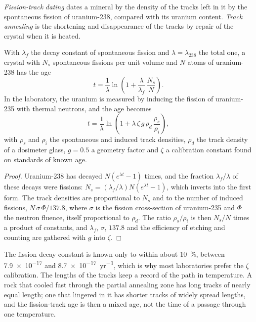\begin{definition}\label{def:b3:advanced-geochronology:fission-track}
\emph{Fission-track dating} dates a mineral by
the density of the tracks left in it by the spontaneous fission of
uranium-238, compared with its uranium content. \emph{Track
annealing} is the shortening and disappearance of the
tracks by repair of the crystal when it is heated.
\end{definition}

\begin{theorem}\label{thm:b3:advanced-geochronology:fission-track}
With $\lambda_f$ the decay constant of spontaneous fission and $\lambda =
\lambda_{238}$ the total one, a crystal with $N_s$ spontaneous fissions per unit
volume and $N$ atoms of uranium-238 has the age
\[
t = \frac1\lambda\ln\left(1 + \frac{\lambda}{\lambda_f}\,\frac{N_s}{N}\right).
\]
In the laboratory, the uranium is measured by inducing the fission of
uranium-235 with thermal neutrons, and the age becomes
\[
t = \frac1\lambda\ln\left(1 + \lambda\,\zeta\,g\,\rho_d\,\frac{\rho_s}{\rho_i}\right),
\]
with $\rho_s$ and $\rho_i$ the spontaneous and induced track densities,
$\rho_d$ the track density of a dosimeter glass, $g = 0.5$ a geometry factor
and $\zeta$ a calibration constant found on standards of known age.
\end{theorem}

\begin{proof}
Uranium-238 has decayed $N(e^{\lambda t} - 1)$ times, and the fraction
$\lambda_f/\lambda$ of these decays were fissions: $N_s =
(\lambda_f/\lambda)N(e^{\lambda t} - 1)$, which inverts into the first form.
The track densities are proportional to $N_s$ and to the number of induced
fissions, $N\,\sigma\,\Phi/137.8$, where $\sigma$ is the fission
cross-section of uranium-235 and $\Phi$ the neutron fluence, itself
proportional to $\rho_d$. The ratio $\rho_s/\rho_i$ is then $N_s/N$ times
a product of constants, and $\lambda_f$, $\sigma$, $137.8$ and the efficiency
of etching and counting are gathered with $g$ into $\zeta$.
\end{proof}

The fission decay constant is known only to within about \qty{10}{\percent},
between \num{7.9e-17} and \qty{8.7e-17}{yr^{-1}}, which is why most
laboratories prefer the $\zeta$ calibration. The lengths of the tracks keep
a record of the path in temperature. A rock that cooled fast through the
partial annealing zone has long tracks of nearly equal length; one that
lingered in it has shorter tracks of widely spread lengths, and the
fission-track age is then a mixed age, not the time of a passage through one
temperature.

